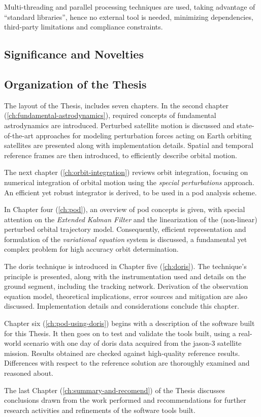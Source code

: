 Multi-threading and parallel processing techniques are used, taking advantage of 
``standard libraries'', hence no external tool is needed, minimizing dependencies, 
third-party limitations and compliance constraints.


\subsection{Significance and Novelties}\label{ssec:significance-and-novelty}

\subsection{Organization of the Thesis}\label{ssec:organization}
The layout of the Thesis, includes seven chapters. In the second chapter
(\autoref{ch:fundamental-astrodynamics}), required concepts of
fundamental astrodynamics are introduced. Perturbed satellite motion is discussed and
state-of-the-art approaches for modeling perturbation forces acting on Earth orbiting
satellites are presented along with implementation details. Spatial and temporal reference
frames are then introduced, to efficiently describe orbital motion.

The next chapter (\autoref{ch:orbit-integration}) reviews orbit integration, focusing on
numerical integration of orbital motion using the \emph{special perturbations}
approach. An efficient yet robust integrator is derived, to be used in a \gls{pod}
analysis scheme.

In Chapter four (\autoref{ch:pod}), an overview of \gls{pod} concepts is given,
with special attention on the \emph{Extended Kalman Filter} and the linearization
of the (non-linear) perturbed orbital trajectory model. Consequently, efficient
representation and formulation of the \emph{variational equation} system is discussed,
a fundamental yet complex problem for high accuracy orbit determination.

The \gls{doris} technique is introduced in Chapter five (\autoref{ch:doris}).
The technique's principle is presented, along with the instrumentation used and
details on the ground segment, including the tracking network. Derivation of the
observation equation model, theoretical implications, error sources and mitigation are
also discussed. Implementation details and considerations conclude this
chapter.

Chapter six (\autoref{ch:pod-using-doris}) begins with a description of the
software built for this Thesis. It then goes on to test and validate the tools built,
using a real-world scenario with one day of \gls{doris} data acquired from the
\gls{jason}-3 satellite mission. Results obtained are checked against high-quality
reference results. Differences with respect to the reference solution are thoroughly
examined and reasoned about.

The last Chapter (\autoref{ch:summary-and-recomend}) of the Thesis discusses
conclusions drawn from the work performed and recommendations for further research
activities and refinements of the software tools built.

\iffalse

\fi
